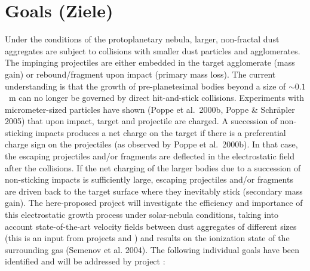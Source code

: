 \section{Goals (Ziele)}
Under the conditions of the protoplanetary nebula, larger,
non-fractal dust aggregates are subject to collisions with smaller
dust particles and agglomerates. The impinging projectiles are
either embedded in the target agglomerate (mass gain) or
rebound/fragment upon impact (primary mass loss). The current
understanding is that the growth of pre-planetesimal bodies beyond
a size of $\sim 0.1$~m can no longer be governed by direct
hit-and-stick collisions. Experiments with micrometer-sized
particles have shown (Poppe et al.~2000b, Poppe \& Schr\"apler
2005) that upon impact, target and projectile are charged. A
succession of non-sticking impacts produces a net charge on the
target if there is a preferential charge sign on the projectiles
(as observed by Poppe et al.~2000b). In that case, the escaping
projectiles and/or fragments are deflected in the electrostatic
field after the collisions. If the net charging of the larger
bodies due to a succession of non-sticking impacts is sufficiently
large, escaping projectiles and/or fragments are driven back to
the target surface where they inevitably stick (secondary mass
gain). The here-proposed project will investigate the efficiency
and importance of this electrostatic growth process under
solar-nebula conditions, taking into account state-of-the-art
velocity fields between dust aggregates of different sizes (this
is an input from projects \projklahr{} and \projdul{}) and results
on the ionization state of the surrounding gas (Semenov et al.
2004). The following individual goals have been identified and
will be addressed by project \projblum{}:
